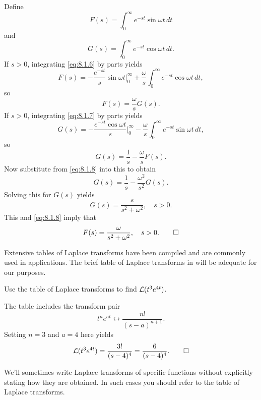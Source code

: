 \begin{solution}
Define
\begin{equation}\label{eq:8.1.6}
F(s)=\int_0^\infty e^{-st}\sin\omega t\,dt
\end{equation}
and
\begin{equation}\label{eq:8.1.7}
G(s)=\int_0^\infty e^{-st}\cos\omega t\,dt.
\end{equation}
If $s>0$, integrating  \eqref{eq:8.1.6} by parts yields
\[
F(s)=-\frac{e^{-st}}{s}\sin\omega t\Big|_0^\infty+\frac{\omega}{s}
\int_0^\infty e^{-st}\cos\omega t\,dt,
\]
so
\begin{equation}\label{eq:8.1.8}
F(s)=\frac{\omega}{s}G(s).
\end{equation}
If $s>0$, integrating  \eqref{eq:8.1.7} by parts yields
\[
G(s)=-\frac{e^{-st}\cos\omega t}{s}\Big|_0^\infty - \frac{\omega}{s}
\int_0^\infty e^{-st}\sin\omega t\,dt,
\]
so
\[
G(s)=\frac{1}{s} - \frac{\omega}{s} F(s).
\]
Now substitute from  \eqref{eq:8.1.8} into this to obtain
\[
G(s)=\frac{1}{s} - \frac{\omega^2}{s^2} G(s).
\]
Solving this for $G(s)$ yields
\[
G(s)=\frac{s}{s^2+\omega^2},\quad s>0.
\]
This and  \eqref{eq:8.1.8} imply that
\[
F(s)=\frac{\omega}{s^2+\omega^2},\quad s>0.\qedhere
\]
\end{solution}



Extensive tables of Laplace transforms have been compiled and are
commonly used in applications. The brief table of Laplace transforms
in  will be adequate for our
purposes.

\begin{example}\label{example:8.1.5}
Use the
table of Laplace transforms to find  ${\mathcal L}(t^3e^{4t})$.
\end{example}

\begin{solution}
The table
includes the transform pair
\[
t^ne^{at}\leftrightarrow\frac{n!}{(s-a)^{n+1}}.
\]
Setting $n=3$  and $a=4$ here yields
\[
{\mathcal L}(t^3e^{4t})=\frac{3!}{(s-4)^4}=\frac{6}{(s-4)^4}.\qedhere
\]
\end{solution}

We'll  sometimes write Laplace transforms of specific functions
without explicitly stating how they are obtained. In such cases you
should refer to the table of Laplace transforms.



